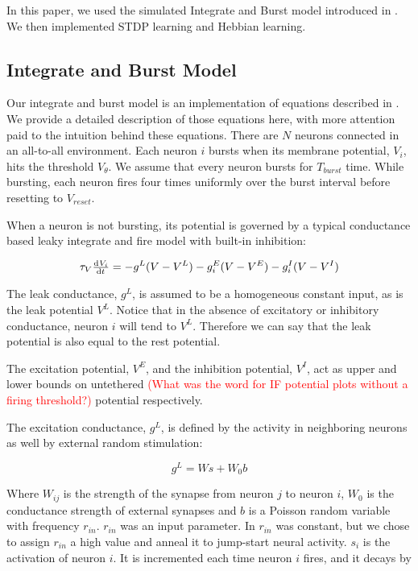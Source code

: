 In this paper, we used the simulated Integrate and Burst model introduced in \cite{Fiete}. We then implemented STDP learning and Hebbian learning.

\subsection{Integrate and Burst Model}

Our integrate and burst model is an implementation of equations described in \cite{Fiete}. We provide a detailed description of those equations here, with more attention paid to the intuition behind these equations. There are \(N\) neurons connected in an all-to-all environment. Each neuron \(i\) bursts when its membrane potential, \(V_i\), hits the threshold \(V_\theta\). We assume that every neuron bursts for \(T_{burst}\) time. While bursting, each neuron fires four times uniformly over the burst interval before resetting to \(V_{reset}\).

When a neuron is not bursting, its potential is governed by a typical conductance based leaky integrate and fire model with built-in inhibition:

\begin{equation}
\tau_V \od{V_i}{t} = -g^L(V - V^L) - g^E_i(V - V^E) - g^I_i(V - V^I)
\label{Potential}
\end{equation}

The leak conductance, \(g^L\), is assumed to be a homogeneous constant input, as is the leak potential \(V^L\). Notice that in the absence of excitatory or inhibitory conductance, neuron \(i\) will tend to \(V^L\). Therefore we can say that the leak potential is also equal to the rest potential.

The excitation potential, \(V^E\), and the inhibition potential, \(V^I\), act as upper and lower bounds on untethered \textcolor{red}{(What was the word for IF potential plots without a firing threshold?)} potential respectively. 

The excitation conductance, \(g^L\), is defined by the activity in neighboring neurons as well by external random stimulation:

\[g^L = Ws + W_0b\]

Where \(W_{ij}\) is the strength of the synapse from neuron \(j\) to neuron \(i\), \(W_0\) is the conductance strength of external synapses and \(b\) is a Poisson random variable with frequency \(r_{in}\). \(r_{in}\) was an input parameter. In \cite{Fiete} \(r_{in}\) was constant, but we chose to assign \(r_{in}\) a high value and anneal it to jump-start neural activity. \(s_i\) is the activation of neuron \(i\). It is incremented each time neuron \(i\) fires, and it decays by

